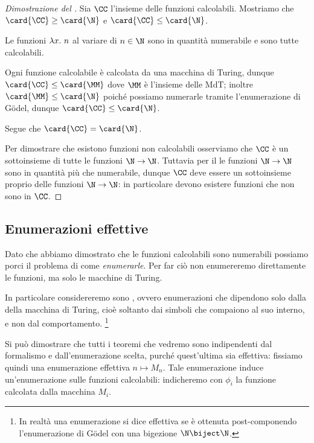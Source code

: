 \begin{proof}[Dimostrazione del ]
    Sia $\CC$ l'insieme delle funzioni calcolabili. Mostriamo che $\card{\CC} \geq \card{\N}$ e $\card{\CC} \leq \card{\N}$.
    
    \newthought{$\card{\CC} \geq \card{\N}$} Le funzioni $\lambda{x}.\ {n}$ al variare di $n \in \N$ sono in quantità numerabile e sono tutte calcolabili.
    
    \newthought{$\card{\CC} \leq \card{\N}$} Ogni funzione calcolabile è calcolata da una macchina di Turing, dunque $\card{\CC} \leq \card{\MM}$ dove $\MM$ è l'insieme delle MdT; inoltre $\card{\MM} \leq \card{\N}$ poiché possiamo numerarle tramite l'enumerazione di G\"odel, dunque $\card{\CC} \leq \card{\N}$.

    \medskip
    Segue che $\card{\CC} = \card{\N}$.
    
    Per dimostrare che esistono funzioni non calcolabili osserviamo che $\CC$ è un sottoinsieme di tutte le funzioni $\N \to \N$. Tuttavia per il  le funzioni $\N \to \N$ sono in quantità più che numerabile, dunque $\CC$ deve essere un sottoinsieme proprio delle funzioni $\N \to \N$: in particolare devono esistere funzioni che non sono in $\CC$.   
\end{proof}

\subsection{Enumerazioni effettive}

Dato che abbiamo dimostrato che le funzioni calcolabili sono numerabili possiamo porci il problema di come \emph{enumerarle}. Per far ciò non enumereremo direttamente le funzioni, ma solo le macchine di Turing.

In particolare considereremo sono , ovvero enumerazioni che dipendono solo dalla  della macchina di Turing, cioè soltanto dai simboli che compaiono al suo interno, e non dal comportamento. \footnote{In realtà una enumerazione si dice effettiva se è ottenuta post-componendo l'enumerazione di G\"odel con una bigezione $\N \biject \N$.}

Si può dimostrare che tutti i teoremi che vedremo sono indipendenti dal formalismo e dall'enumerazione scelta, purché quest'ultima sia effettiva: fissiamo quindi una enumerazione effettiva $n \mapsto M_n$.
Tale enumerazione induce un'enumerazione sulle funzioni calcolabili: indicheremo con $\phi_i$ la funzione calcolata dalla macchina $M_i$.

